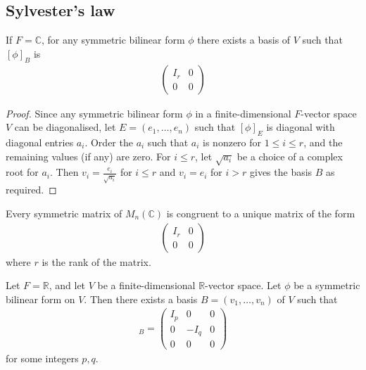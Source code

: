 \subsection{Sylvester's law}
\begin{corollary}
	If $F = \mathbb C$, for any symmetric bilinear form $\phi$ there exists a basis of $V$ such that $[\phi]_B$ is
	\begin{align*}
		\begin{pmatrix}
			I_r & 0 \\
			0   & 0
		\end{pmatrix}
	\end{align*}
\end{corollary}
\begin{proof}
	Since any symmetric bilinear form $\phi$ in a finite-dimensional $F$-vector space $V$ can be diagonalised, let $E = (e_1, \dots, e_n)$ such that $[\phi]_E$ is diagonal with diagonal entries $a_i$.
	Order the $a_i$ such that $a_i$ is nonzero for $1 \leq i \leq r$, and the remaining values (if any) are zero.
	For $i \leq r$, let $\sqrt{a_i}$ be a choice of a complex root for $a_i$.
	Then $v_i = \frac{e_i}{\sqrt{a_i}}$ for $i \leq r$ and $v_i = e_i$ for $i > r$ gives the basis $B$ as required.
\end{proof}
\begin{corollary}
	Every symmetric matrix of $M_n(\mathbb C)$ is congruent to a unique matrix of the form
	\begin{align*}
		\begin{pmatrix}
			I_r & 0 \\
			0   & 0
		\end{pmatrix}
	\end{align*}
	where $r$ is the rank of the matrix.
\end{corollary}
\begin{corollary}
	Let $F = \mathbb R$, and let $V$ be a finite-dimensional $\mathbb R$-vector space.
	Let $\phi$ be a symmetric bilinear form on $V$.
	Then there exists a basis $B = (v_1, \dots, v_n)$ of $V$ such that
	\begin{align*}
		[\phi]_B = \begin{pmatrix}
			I_p & 0    & 0 \\
			0   & -I_q & 0 \\
			0   & 0    & 0
		\end{pmatrix}
	\end{align*}
	for some integers $p, q$.
\end{corollary}
